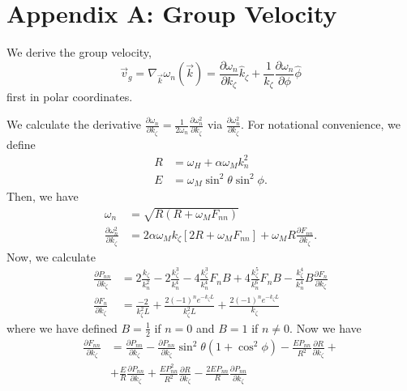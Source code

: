 \documentclass{article}
\begin{document}
\section{Appendix A: Group Velocity}
We derive the group velocity,
\begin{equation}
\vec{v}_{g} = \nabla_{\vec{k}} \omega_{n} (\vec{k}) = \frac{\partial \omega_{n}}{\partial k_{\zeta}} \hat{k}_{\zeta} + \frac{1}{k_{\zeta}} \frac{\partial \omega_{n}}{\partial \phi} \hat{\phi}
\end{equation}
first in polar coordinates.

We calculate the derivative $\frac{\partial \omega_{n}}{\partial k_{\zeta}} = \frac{1}{2 \omega_{n}} \frac{\partial \omega_{n}^2}{\partial k_{\zeta}}$ via $\frac{\partial \omega_{n}^2}{\partial k_{\zeta}}$. For notational convenience, we define 
\begin{align}
R &= \omega_{H} + \alpha \omega_{M} k_{n}^2 \\
E &= \omega_{M} \sin^2{\theta} \sin^2{\phi}.
\end{align}
Then, we have
\begin{align}
\omega_{n} &= \sqrt{R(R + \omega_{M} F_{nn})} \\
\frac{\partial \omega_{n}^2}{\partial k_{\zeta}} &= 2  \alpha \omega_{M} k_{\zeta} \left[2R + \omega_{M} F_{nn} \right] + \omega_{M} R \frac{\partial F_{nn}}{\partial k_{\zeta}}.
\end{align}
Now, we calculate
\begin{align}
\frac{\partial P_{nn}}{\partial k_{\zeta}} &= 2 \frac{k_{\zeta}}{k_{n}^{2}} - 2 \frac{k_{\zeta}^3}{k_{n}^{4}} - 4 \frac{k_{\zeta}^3}{k_{n}^{4}}   F_{n} B + 4 \frac{k_{\zeta}^5}{k_{n}^{6}} F_{n} B - \frac{k_{\zeta}^4}{k_{n}^{4}} B \frac{\partial F_{n}}{\partial k_{\zeta}} \\
\frac{\partial F_{n}}{\partial k_{\zeta}} &= \frac{-2}{k_{\zeta}^2 L} + \frac{2 (-1)^n e^{-k_{\zeta} L}}{k_{\zeta}^2 L} + \frac{2 (-1)^n e^{-k_{\zeta} L}}{k_{\zeta}}
\end{align}
where we have defined $B = \frac{1}{2}$ if $n=0$ and $B=1$ if $n \neq 0$.
Now we have
\begin{align}
\frac{\partial F_{nn}}{\partial k_{\zeta}} &= \frac{\partial P_{nn}}{\partial k_{\zeta}} - \frac{\partial P_{nn}}{\partial k_{\zeta}} \sin^2{\theta} (1 + \cos^2{\phi}) - \frac{E P_{nn}}{R^2} \frac{\partial R}{\partial k_{\zeta}} + \\
&+ \frac{E}{R} \frac{\partial P_{nn}}{\partial k_{\zeta}}  + \frac{E P_{nn}^2}{R^2} \frac{\partial R}{\partial k_{\zeta}} - \frac{2 E P_{nn}}{R} \frac{\partial P_{nn}}{\partial k_{\zeta}} \nonumber
\end{align}
\end{document}
